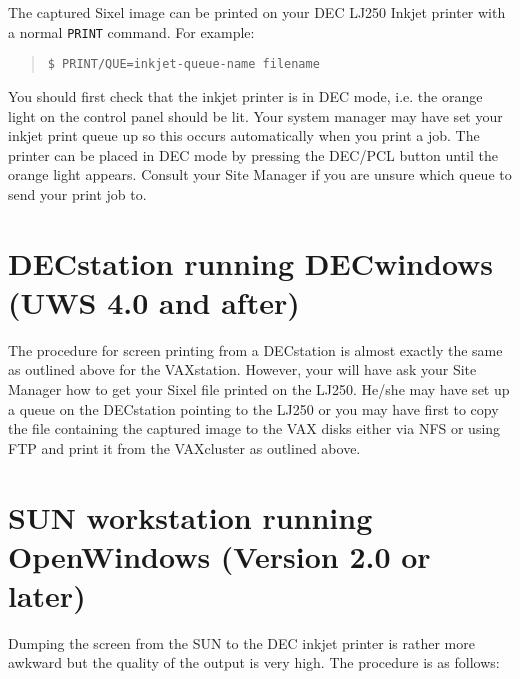 The captured Sixel image can be printed on your DEC LJ250 Inkjet printer with 
a normal {\tt PRINT} command. For example:

\begin{quote}

{\tt \$ PRINT/QUE=inkjet-queue-name filename}

\end{quote}

You should first check that the inkjet printer is in DEC mode, i.e. the orange
light on the control panel should be lit. Your system manager may have set your
inkjet print queue up so this occurs automatically when you print a job. The
printer can be placed in DEC mode by pressing the DEC/PCL button until the
orange light appears. Consult your Site Manager if you are unsure which 
queue to send your print job to.

\section{DECstation running DECwindows (UWS 4.0 and after)}

The procedure for screen printing from a DECstation is almost exactly the same
as outlined above for the VAXstation. However, your will have ask your Site
Manager how to get your Sixel file printed on the LJ250. He/she may have
set up a queue on the DECstation pointing to the LJ250 or you may have
first to copy the file containing the captured image to the VAX disks either
via NFS or using FTP and print it from the VAXcluster as outlined above.

\section{SUN workstation running OpenWindows (Version 2.0 or later)}

Dumping the screen from the SUN to the DEC inkjet printer is rather more
awkward but the  quality of the output is very high. The procedure is as
follows:

